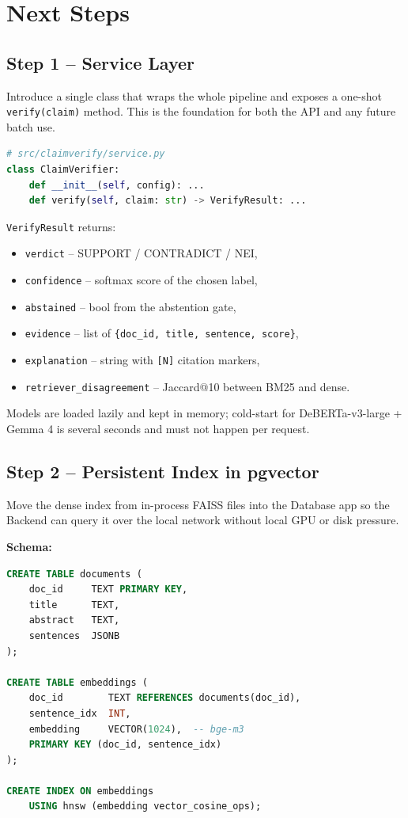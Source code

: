 \documentclass[11pt,a4paper]{article}
\begin{document}
\section{Next Steps}

\subsection{Step 1 -- Service Layer}

Introduce a single class that wraps the whole pipeline and exposes a
one-shot \texttt{verify(claim)} method. This is the foundation for both
the API and any future batch use.

\begin{lstlisting}[language=Python]
# src/claimverify/service.py
class ClaimVerifier:
    def __init__(self, config): ...
    def verify(self, claim: str) -> VerifyResult: ...
\end{lstlisting}

\texttt{VerifyResult} returns:
\begin{itemize}
  \item \texttt{verdict} -- SUPPORT / CONTRADICT / NEI,
  \item \texttt{confidence} -- softmax score of the chosen label,
  \item \texttt{abstained} -- bool from the abstention gate,
  \item \texttt{evidence} -- list of
        \texttt{\{doc\_id, title, sentence, score\}},
  \item \texttt{explanation} -- string with \texttt{[N]} citation markers,
  \item \texttt{retriever\_disagreement} -- Jaccard@10 between BM25 and
        dense.
\end{itemize}

Models are loaded lazily and kept in memory; cold-start for
DeBERTa-v3-large + Gemma 4 is several seconds and must not happen per
request.

\subsection{Step 2 -- Persistent Index in pgvector}

Move the dense index from in-process FAISS files into the Database app
so the Backend can query it over the local network without local GPU or
disk pressure.

\textbf{Schema:}
\begin{lstlisting}[language=SQL]
CREATE TABLE documents (
    doc_id     TEXT PRIMARY KEY,
    title      TEXT,
    abstract   TEXT,
    sentences  JSONB
);

CREATE TABLE embeddings (
    doc_id        TEXT REFERENCES documents(doc_id),
    sentence_idx  INT,
    embedding     VECTOR(1024),  -- bge-m3
    PRIMARY KEY (doc_id, sentence_idx)
);

CREATE INDEX ON embeddings
    USING hnsw (embedding vector_cosine_ops);
\end{lstlisting}
\end{document}
